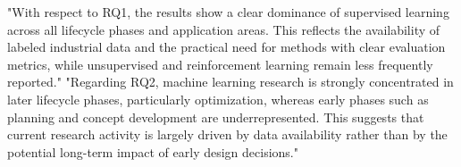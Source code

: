"With respect to RQ1, the results show a clear dominance of supervised learning across all lifecycle phases and application areas. This reflects the availability of labeled industrial data and the practical need for methods with clear evaluation metrics, while unsupervised and reinforcement learning remain less frequently reported."
"Regarding RQ2, machine learning research is strongly concentrated in later lifecycle phases, particularly optimization, whereas early phases such as planning and concept development are underrepresented. This suggests that current research activity is largely driven by data availability rather than by the potential long-term impact of early design decisions."
